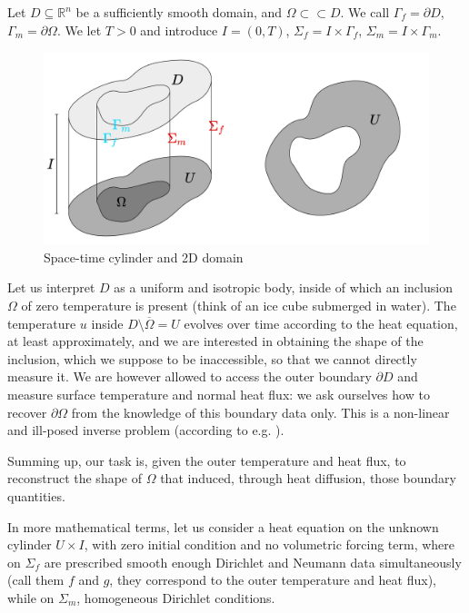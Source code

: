 \documentclass[english,a4paper,10pt,oneside]{scrbook}	%
\theoremstyle{break}
\theoremstyle{remark}
\newcommand{\mR}{\mathbb{R}}
\newcommand{\cc}{\subset\subset}
\begin{document}
Let $D\subseteq\mR^n$ be a sufficiently smooth domain, and $\Omega \cc D$. We call $\Gamma_f=\partial D$, $\Gamma_m = \partial \Omega$. We let $T>0$ and introduce $I = (0,T)$, $\Sigma_f=I\times \Gamma_f$, $\Sigma_m=I\times \Gamma_m$.

\begin{figure}[H]
\centering
\includegraphics[height=0.35\columnwidth]{Images/Domains.pdf}
\caption{Space-time cylinder and 2D domain}\label{fig:space_time}
\end{figure}

Let us interpret $D$ as a uniform and isotropic body, inside of which an inclusion $\Omega$ of zero temperature is present (think of an ice cube submerged in water). The temperature $u$ inside $D\setminus \overline{\Omega} = U$ evolves over time according to the heat equation, at least approximately, and we are interested in obtaining the shape of the inclusion, which we suppose to be inaccessible, so that we cannot directly measure it. We are however allowed to access the outer boundary $\partial D$ and measure surface temperature and normal heat flux: we ask ourselves how to recover $\partial \Omega$ from the knowledge of this boundary data only. This is a non-linear and ill-posed inverse problem (according to e.g. \cite{harbrecht}). 

Summing up, our task is, given the outer temperature and heat flux, to reconstruct the shape of $\Omega$ that induced, through heat diffusion, those boundary quantities.

In more mathematical terms, let us consider a heat equation on the unknown cylinder $U\times I$, with zero initial condition and no volumetric forcing term, where on $\Sigma_f$ are prescribed smooth enough Dirichlet and Neumann data simultaneously (call them $f$ and $g$, they correspond to the outer temperature and heat flux), while on $\Sigma_m$, homogeneous Dirichlet conditions.
\end{document}
